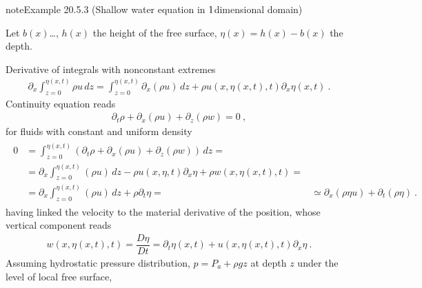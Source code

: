 \documentclass[letterpaper,10pt,english]{jupyterBook}
\begin{document}
\begin{sphinxadmonition}{note}{Example 20.5.3 (Shallow water equation in \protect\(1\protect\)\sphinxhyphen{}dimensional domain)}



\sphinxAtStartPar
Let \(b(x)\)…, \(h(x)\) the height of the free surface, \(\eta(x) = h(x) - b(x)\) the depth.

\sphinxAtStartPar
Derivative of integrals with non\sphinxhyphen{}constant extremes
\begin{equation*}
\begin{split}\partial_x \int_{z=0}^{\eta(x,t)} \rho u \, dz = \int_{z=0}^{\eta(x,t)} \partial_x (\rho u) \, dz + \rho u(x,\eta(x,t),t) \partial_x \eta(x,t) \ .\end{split}
\end{equation*}
\sphinxAtStartPar
Continuity equation reads
\begin{equation*}
\begin{split}\partial_t \rho + \partial_x (\rho u ) + \partial_z (\rho w) = 0 \ ,\end{split}
\end{equation*}
\sphinxAtStartPar
for fluids with constant and uniform density
\begin{equation*}
\begin{split}\begin{aligned}
  0
  & = \int_{z=0}^{\eta(x,t)} \left( \partial_t \rho + \partial_x (\rho u) + \partial_z (\rho w) \right) \, dz = \\
  & = \partial_x \int_{z=0}^{\eta(x,t)} (\rho u) \, dz - \rho u(x,\eta,t) \partial_x \eta + \rho w(x,\eta(x,t),t) = \\
  & = \partial_x \int_{z=0}^{\eta(x,t)} (\rho u) \, dz + \rho \partial_t \eta = 
  & \simeq \partial_x \left(  \rho \eta u \right) + \partial_t \left( \rho \eta \right) \ .
\end{aligned}\end{split}
\end{equation*}
\sphinxAtStartPar
having linked the velocity to the material derivative of the position, whose vertical component reads
\begin{equation*}
\begin{split}w(x,\eta(x,t), t) = \dfrac{D \eta}{Dt} = \partial_t \eta(x,t) + u(x,\eta(x,t),t) \partial_x \eta \ .\end{split}
\end{equation*}
\sphinxAtStartPar
Assuming hydrostatic pressure distribution, \(p = P_a + \rho g z\) at depth \(z\) under the level of local free surface,


\end{sphinxadmonition}
\end{document}

